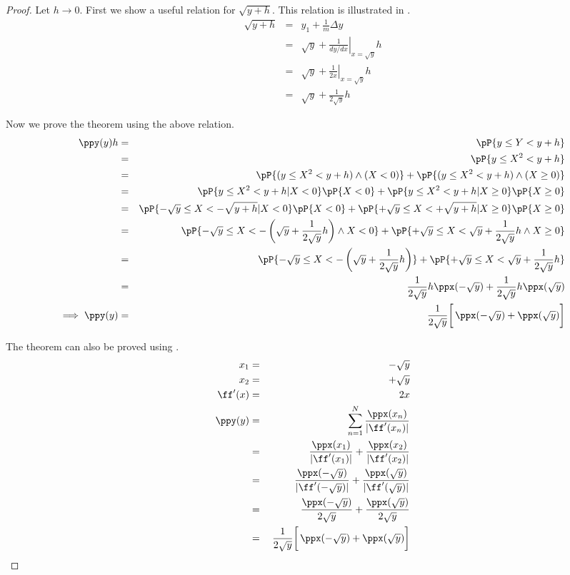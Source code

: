 \begin{proof}
Let $h\to0$.
First we show a useful relation for $\sqrt{y+h}$.
This relation is illustrated in .
\begin{eqnarray*}
  \sqrt{y+h}
    &=&    y_1 + \frac{1}{m} \Delta y
  \\&=&    \sqrt{y} + \left.\frac{1}{dy/dx}\right|_{x=\sqrt{y}} h
  \\&=&    \sqrt{y} + \left.\frac{1}{2x}\right|_{x=\sqrt{y}} h
  \\&=&    \sqrt{y} + \frac{1}{2\sqrt{y}} h
\end{eqnarray*}

Now we prove the theorem using the above relation.
\begin{eqnarray*}
  \ppy(y)h
    &=&    \pP{y\le Y < y+h}
  \\&=&    \pP{y\le X^2 < y+h}
  \\&=&    \pP{(y\le X^2 < y+h) \land (X<0)}+ \pP{(y\le X^2 < y+h) \land (X\ge0)}
  \\&=&    \pP{y\le X^2 < y+h | X<0}\pP{X<0} + \pP{y\le X^2 < y+h | X\ge0}\pP{X\ge0}
  \\&=&    \pP{-\sqrt{y}\le X < -\sqrt{y+h} | X<0  } \pP{X<0} +
           \pP{+\sqrt{y}\le X < +\sqrt{y+h} | X\ge0} \pP{X\ge0}
  \\&=&    \pP{-\sqrt{y}\le X < -\left(\sqrt{y}+\frac{1}{2\sqrt{y}}h\right) \land X<0   } +
           \pP{+\sqrt{y}\le X <        \sqrt{y}+\frac{1}{2\sqrt{y}}h        \land X\ge0 }
  \\&=&    \pP{-\sqrt{y}\le X < -\left(\sqrt{y}+\frac{1}{2\sqrt{y}}h\right)  } +
           \pP{+\sqrt{y}\le X <        \sqrt{y}+\frac{1}{2\sqrt{y}}h         }
  \\&=&    \frac{1}{2\sqrt{y}}h\ppx(-\sqrt{y})  +
           \frac{1}{2\sqrt{y}}h\ppx( \sqrt{y})
\\\implies
  \ppy(y)
    &=&    \left.\left.\frac{1}{2\sqrt{y}}\right[
           \ppx(-\sqrt{y}) + \ppx( \sqrt{y}) \right]
\end{eqnarray*}

The theorem can also be proved using .
\begin{eqnarray*}
  x_1 &=& -\sqrt{y} \\
  x_2 &=& +\sqrt{y} \\
  \ff'(x) &=& 2x    \\
  \ppy(y)
    &=& \sum_{n=1}^N \frac{\ppx(x_n)}{|\ff'(x_n)|}
  \\&=& \frac{\ppx(x_1)}{|\ff'(x_1)|} + \frac{\ppx(x_2)}{|\ff'(x_2)|}
  \\&=& \frac{\ppx(-\sqrt{y})}{|\ff'(-\sqrt{y})|} + \frac{\ppx(\sqrt{y})}{|\ff'(\sqrt{y})|}
  \\&=& \frac{\ppx(-\sqrt{y})}{2\sqrt{y}} + \frac{\ppx(\sqrt{y})}{2\sqrt{y}}
  \\&=&    \left.\left.\frac{1}{2\sqrt{y}}\right[
           \ppx(-\sqrt{y}) + \ppx( \sqrt{y}) \right]
\end{eqnarray*}
\end{proof}




